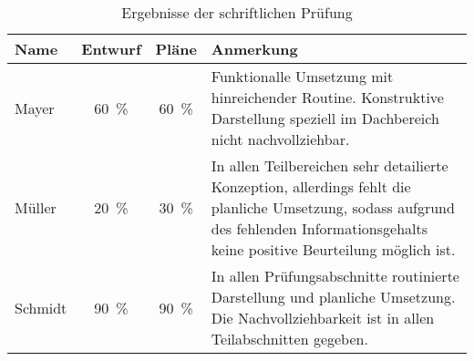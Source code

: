 \begin{table}[h]
\caption{Ergebnisse der schriftlichen Prüfung \label{tab:test}}
   \begin{tabularx}{\textwidth}{@{}lccX@{}}
   \toprule
   Name & Entwurf     & Pläne       & Anmerkung    \\
   \midrule
   Mayer    & \SI{60}{\%} & \SI{60}{\%} & 
      Funktionalle Umsetzung mit hinreichender Routine. Konstruktive Darstellung speziell im Dachbereich nicht nachvollziehbar. \\
   Müller   & \SI{20}{\%} & \SI{30}{\%} & 
      In allen Teilbereichen sehr detailierte Konzeption, allerdings fehlt die planliche Umsetzung, sodass aufgrund des fehlenden Informationsgehalts keine positive Beurteilung möglich ist. \\
   Schmidt  & \SI{90}{\%} & \SI{90}{\%} & 
      In allen Prüfungsabschnitte routinierte Darstellung und planliche Umsetzung. Die Nachvollziehbarkeit ist in allen Teilabschnitten gegeben. \\
   \bottomrule
   \end{tabularx}
\end{table}





